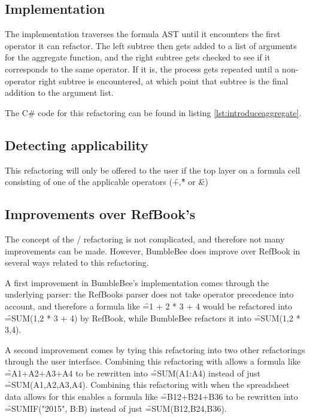 \subsection{Implementation}

The implementation traverses the formula AST until it encounters the first operator it can refactor.
The left subtree then gets added to a list of arguments for the aggregate function, and the right subtree gets checked to see if it corresponds to the same operator.
If it is, the process gets repeated until a non-operator right subtree is encountered, at which point that subtree is the final addition to the argument list.

The C\# code for this refactoring can be found in listing \ref{lst:introduceaggregate}.

\subsection{Detecting applicability}

This refactoring will only be offered to the user if the top layer on a formula cell consisting of one of the applicable operators (\f{+},\f{*} or \f{\&})

\subsection{Improvements over RefBook's }

The concept of the / refactoring is not complicated, and therefore not many improvements can be made.
However, BumbleBee does improve over RefBook in several ways related to this refactoring.

A first improvement in BumbleBee's implementation comes through the underlying parser: the RefBooks parser does not take operator precedence into account, and therefore a formula like \f{=1 + 2 * 3 + 4} would be refactored into \f{=SUM(1,2 * 3 + 4)} by RefBook, while BumbleBee refactors it into \f{=SUM(1,2 * 3,4)}.

A second improvement comes by tying this refactoring into two other refactorings through the user interface.
Combining this refactoring with  allows a formula like \f{=A1+A2+A3+A4} to be rewritten into \f{=SUM(A1:A4)} instead of just \f{=SUM(A1,A2,A3,A4)}.
Combining this refactoring with  when the spreadsheet data allows for this enables a formula like \f{=B12+B24+B36} to be rewritten into \f{=SUMIF("2015", B:B)} instead of just \f{=SUM(B12,B24,B36)}.

